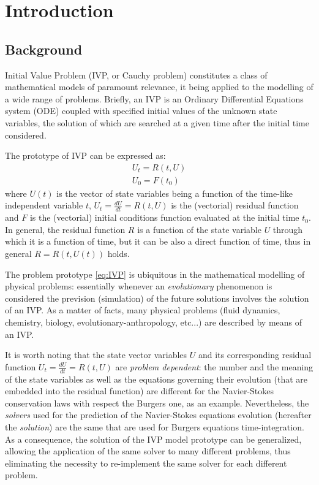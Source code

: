 \documentclass[pdftex,preprint,3p,times,numbers]{elsarticle}
\begin{document}
\section{Introduction}\label{sec:introduction}
\subsection{Background}

Initial Value Problem (IVP, or Cauchy problem) constitutes a class of mathematical models of paramount relevance, it being applied to the modelling of a wide range of problems. Briefly, an IVP is an Ordinary Differential Equations system (ODE) coupled with specified initial values of the unknown state variables, the solution of which are searched at a given time after the initial time considered.

The prototype of IVP can be expressed as:
\begin{equation}
  \begin{matrix}
  U_t = R(t,U) \\
  U_0 = F(t_0)
  \end{matrix}
\label{eq:IVP}
\end{equation}
where $U(t)$ is the vector of state variables being a function of the time-like independent variable $t$, $U_t = \frac{dU}{dt} = R(t,U)$ is the (vectorial) residual function and $F$ is the (vectorial) initial conditions function evaluated at the initial time $t_0$. In general, the residual function $R$ is a function of the state variable $U$ through which it is a function of time, but it can be also a direct function of time, thus in general $R=R(t,U(t))$ holds.

The problem prototype \ref{eq:IVP} is ubiquitous in the mathematical modelling of physical problems: essentially whenever an \emph{evolutionary} phenomenon is considered the prevision (simulation) of the future solutions involves the solution of an IVP. As a matter of facts, many physical problems (fluid dynamics, chemistry, biology, evolutionary-anthropology, etc...) are described by means of an IVP.

It is worth noting that the state vector variables $U$ and its corresponding residual function $U_t = \frac{dU}{dt} = R(t,U)$ are \emph{problem dependent}: the number and the meaning of the state variables as well as the equations governing their evolution (that are embedded into the residual function) are different for the Navier-Stokes conservation laws with respect the Burgers one, as an example. Nevertheless, the \emph{solvers} used for the prediction of the Navier-Stokes equations evolution (hereafter the \emph{solution}) are the same that are used for Burgers equations time-integration. As a consequence, the solution of the IVP model prototype can be generalized, allowing the application of the same solver to many different problems, thus eliminating the necessity to re-implement the same solver for each different problem.
\end{document}
